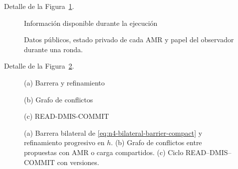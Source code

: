 

Detalle de la Figura~\ref{fig:n3-informacion}.

\begin{figure}[H]\centering
{}
{Información disponible durante la ejecución}
\caption{Datos públicos, estado privado de cada AMR y papel del observador durante
una ronda.}
\label{fig:n3-informacion}
\viuownsource
\end{figure}






Detalle de la Figura~\ref{fig:concurrencia}.

\begin{figure}[H]\centering
{}
{(a) Barrera y refinamiento}
\par\vspace{.4mm}
{(b) Grafo de conflictos}
\par\vspace{.4mm}
{(c) READ-DMIS-COMMIT}
\caption{(a) Barrera bilateral de \eqref{eq:n4-bilateral-barrier-compact} y
refinamiento progresivo en $h$. (b) Grafo de conflictos entre propuestas con AMR o
carga compartidos. (c) Ciclo READ--DMIS--COMMIT con versiones.}
\label{fig:concurrencia}
\end{figure}


